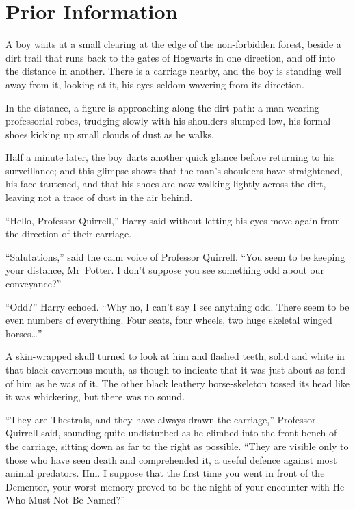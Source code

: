 \chapter{Prior Information}

\lettrine{A}{} boy waits at a small clearing at the edge of the non-forbidden forest, beside a dirt trail that runs back to the gates of Hogwarts in one direction, and off into the distance in another. There is a carriage nearby, and the boy is standing well away from it, looking at it, his eyes seldom wavering from its direction.

In the distance, a figure is approaching along the dirt path: a man wearing professorial robes, trudging slowly with his shoulders slumped low, his formal shoes kicking up small clouds of dust as he walks.

Half a minute later, the boy darts another quick glance before returning to his surveillance; and this glimpse shows that the man’s shoulders have straightened, his face tautened, and that his shoes are now walking lightly across the dirt, leaving not a trace of dust in the air behind.

“Hello, Professor Quirrell,” Harry said without letting his eyes move again from the direction of their carriage.

“Salutations,” said the calm voice of Professor Quirrell. “You seem to be keeping your distance, Mr~Potter. I don’t suppose you see something odd about our conveyance?”

“Odd?” Harry echoed. “Why no, I can’t say I see anything odd. There seem to be even numbers of everything. Four seats, four wheels, two huge skeletal winged horses…”

A skin-wrapped skull turned to look at him and flashed teeth, solid and white in that black cavernous mouth, as though to indicate that it was just about as fond of him as he was of it. The other black leathery horse-skeleton tossed its head like it was whickering, but there was no sound.

“They are Thestrals, and they have always drawn the carriage,” Professor Quirrell said, sounding quite undisturbed as he climbed into the front bench of the carriage, sitting down as far to the right as possible. “They are visible only to those who have seen death and comprehended it, a useful defence against most animal predators. Hm. I suppose that the first time you went in front of the Dementor, your worst memory proved to be the night of your encounter with He-Who-Must-Not-Be-Named?”

